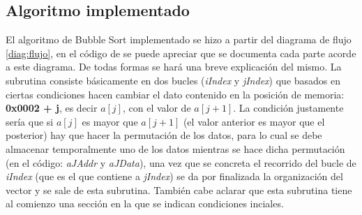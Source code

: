 \documentclass[letterpaper, 10 pt, conference]{ieeeconf}  %
\begin{document}
\subsection{Algoritmo implementado}
El algoritmo de Bubble Sort implementado se hizo a partir del diagrama de flujo \ref{diag:flujo}, en el código de se puede apreciar que se documenta cada parte acorde a este diagrama. De todas formas se hará una breve explicación del mismo. La subrutina consiste básicamente en dos bucles (\textit{iIndex} y \textit{jIndex}) que basados en ciertas condiciones hacen cambiar el dato contenido en la posición de memoria: \textbf{0x0002 + j}, es decir $a[j]$, con el valor de $a[j+1]$. La condición justamente sería que si $a[j]$ es mayor que $a[j+1]$ (el valor anterior es mayor que el posterior) hay que hacer la permutación de los datos, para lo cual se debe almacenar temporalmente uno de los datos mientras se hace dicha permutación (en el código: \textit{aJAddr} y \textit{aJData}), una vez que se concreta el recorrido del bucle de \textit{iIndex} (que es el que contiene a \textit{jIndex}) se da por finalizada la organización del vector y se sale de esta subrutina. También cabe aclarar que esta subrutina tiene al comienzo una sección en la que se indican condiciones inciales.
\end{document}
